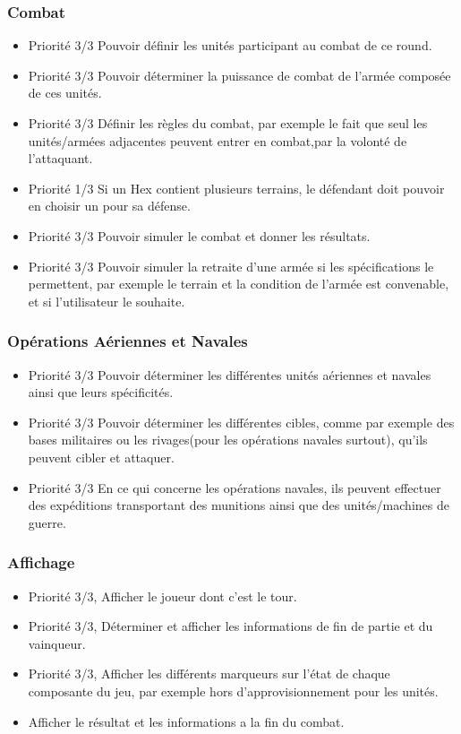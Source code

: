 \documentclass{article}[a4paper, 12pt]
\begin{document}
\subsubsection{Combat}
\begin{itemize}
    \item Priorité 3/3 Pouvoir définir les unités participant au combat de ce round.
    \item Priorité 3/3 Pouvoir déterminer la puissance de combat de l'armée composée de ces unités.
    \item Priorité 3/3 Définir les règles du combat, par exemple le fait que seul les unités/armées adjacentes peuvent entrer en combat,par la volonté de l'attaquant.
    \item Priorité 1/3 Si un Hex contient plusieurs terrains, le défendant doit pouvoir en choisir un pour sa défense.
    \item Priorité 3/3 Pouvoir simuler le combat et donner les résultats.
    \item Priorité 3/3 Pouvoir simuler la retraite d'une armée si les spécifications le permettent, par exemple le terrain et la condition de l'armée est convenable, et si l'utilisateur le souhaite.
\end{itemize}


\subsubsection{Opérations Aériennes et Navales}
    \begin{itemize}
        \item Priorité 3/3 Pouvoir déterminer les différentes unités aériennes et navales ainsi que leurs spécificités.
        \item Priorité 3/3 Pouvoir déterminer les différentes cibles, comme par exemple des bases militaires ou les rivages(pour les opérations navales surtout), qu'ils peuvent cibler et attaquer.
        \item Priorité 3/3 En ce qui concerne les opérations navales, ils peuvent effectuer des expéditions transportant des munitions ainsi que des unités/machines de guerre.
    \end{itemize}



\subsubsection{Affichage}
\begin{itemize}
    \item Priorité 3/3, Afficher le joueur dont c'est le tour.
    \item Priorité 3/3, Déterminer et afficher les informations de fin de partie et du vainqueur.
    \item Priorité 3/3, Afficher les différents marqueurs sur l'état de chaque composante du jeu, par exemple hors d'approvisionnement pour les unités.
    \item Afficher le résultat et les informations a la fin du combat.
\end{itemize}
\end{document}
